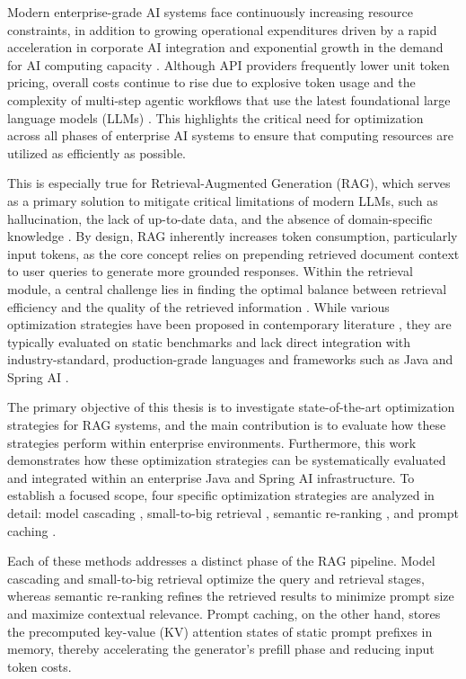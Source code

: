 Modern enterprise-grade AI systems face continuously increasing resource constraints, in addition to growing operational expenditures driven by a rapid acceleration in corporate AI integration and exponential growth in the demand for AI computing capacity \citep{StanfordAIIndex2026}. Although API providers frequently lower unit token pricing, overall costs continue to rise due to explosive token usage and the complexity of multi-step agentic workflows that use the latest foundational large language models (LLMs) \citep{chen2024frugalgpt, GoogleVertexAIPricing}. This highlights the critical need for optimization across all phases of enterprise AI systems to ensure that computing resources are utilized as efficiently as possible.

This is especially true for Retrieval-Augmented Generation (RAG), which serves as a primary solution to mitigate critical limitations of modern LLMs, such as hallucination, the lack of up-to-date data, and the absence of domain-specific knowledge \citep{lewis2020rag, wu2025ragnlp}. By design, RAG inherently increases token consumption, particularly input tokens, as the core concept relies on prepending retrieved document context to user queries to generate more grounded responses. Within the retrieval module, a central challenge lies in finding the optimal balance between retrieval efficiency and the quality of the retrieved information \citep{wu2025ragnlp}. While various optimization strategies have been proposed in contemporary literature \citep{wu2025ragnlp, zhao2024ragandbeyond}, they are typically evaluated on static benchmarks and lack direct integration with industry-standard, production-grade languages and frameworks such as Java and Spring AI \citep{springai}.

The primary objective of this thesis is to investigate state-of-the-art optimization strategies for RAG systems, and the main contribution is to evaluate how these strategies perform within enterprise environments. Furthermore, this work demonstrates how these optimization strategies can be systematically evaluated and integrated within an enterprise Java and Spring AI infrastructure. To establish a focused scope, four specific optimization strategies are analyzed in detail: model cascading \citep{chen2024frugalgpt}, small-to-big retrieval \citep{lumer2026rethinking}, semantic re-ranking \citep{yu2024rankrag}, and prompt caching \citep{gim2024promptcache}. 

Each of these methods addresses a distinct phase of the RAG pipeline. Model cascading and small-to-big retrieval optimize the query and retrieval stages, whereas semantic re-ranking refines the retrieved results to minimize prompt size and maximize contextual relevance. Prompt caching, on the other hand, stores the precomputed key-value (KV) attention states of static prompt prefixes in memory, thereby accelerating the generator's prefill phase and reducing input token costs.


